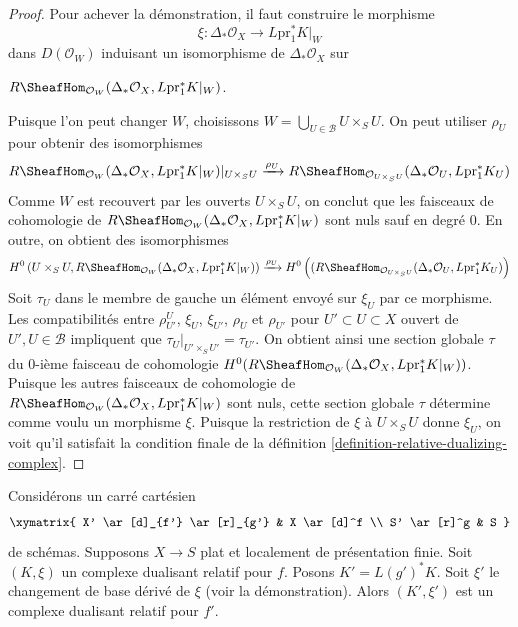 \begin{proof}
\medskip\noindent
Pour achever la démonstration, il faut construire le morphisme
$$
\xi : \Delta_*\mathcal{O}_X \longrightarrow L\text{pr}_1^*K|_W
$$
dans $D(\mathcal{O}_W)$ induisant un isomorphisme de $\Delta_*\mathcal{O}_X$ sur
\par\noindent\hfil
$R\SheafHom_{\mathcal{O}_W}(\Delta_*\mathcal{O}_X, L\text{pr}_1^*K|_W)$.
\hfil\par\noindent
Puisque l'on peut changer $W$, choisissons $W = \bigcup_{U \in \mathcal{B}} U \times_S U$. On peut utiliser $\rho_U$ pour obtenir des isomorphismes
$$
R\SheafHom_{\mathcal{O}_W}(
\Delta_*\mathcal{O}_X, L\text{pr}_1^*K|_W)|_{U \times_S U}
\xrightarrow{\rho_U}
R\SheafHom_{\mathcal{O}_{U \times_S U}}(
\Delta_*\mathcal{O}_U, L\text{pr}_1^*K_U)
$$
Comme $W$ est recouvert par les ouverts $U \times_S U$, on conclut que les faisceaux de cohomologie de
$R\SheafHom_{\mathcal{O}_W}(\Delta_*\mathcal{O}_X, L\text{pr}_1^*K|_W)$
sont nuls sauf en degré $0$. En outre, on obtient des isomorphismes
\begingroup\small
$$
H^0\left(U \times_S U, R\SheafHom_{\mathcal{O}_W}(\Delta_*\mathcal{O}_X,
L\text{pr}_1^*K|_W)\right)
\xrightarrow{\rho_U}
H^0\left((R\SheafHom_{\mathcal{O}_{U \times_S U}}(
\Delta_*\mathcal{O}_U, L\text{pr}_1^*K_U)\right)
$$
\endgroup
Soit $\tau_U$ dans le membre de gauche un élément envoyé sur $\xi_U$ par ce morphisme. Les compatibilités entre $\rho^U_{U'}$, $\xi_U$, $\xi_{U'}$, $\rho_U$ et $\rho_{U'}$ pour $U' \subset U \subset X$ ouvert de $U', U \in \mathcal{B}$ impliquent que $\tau_U|_{U' \times_S U'} = \tau_{U'}$. On obtient ainsi une section globale $\tau$ du $0$-ième faisceau de cohomologie $H^0(R\SheafHom_{\mathcal{O}_W}(\Delta_*\mathcal{O}_X, L\text{pr}_1^*K|_W))$. Puisque les autres faisceaux de cohomologie de
$R\SheafHom_{\mathcal{O}_W}(\Delta_*\mathcal{O}_X, L\text{pr}_1^*K|_W)$
sont nuls, cette section globale $\tau$ détermine comme voulu un morphisme $\xi$. Puisque la restriction de $\xi$ à $U \times_S U$ donne $\xi_U$, on voit qu'il satisfait la condition finale de la définition \ref{definition-relative-dualizing-complex}.
\end{proof}

\begin{lemma}
\label{lemma-base-change-relative-dualizing}
Considérons un carré cartésien
$$
\xymatrix{
X' \ar[d]_{f'} \ar[r]_{g'} & X \ar[d]^f \\
S' \ar[r]^g & S
}
$$
de schémas. Supposons $X \to S$ plat et localement de présentation finie. Soit $(K, \xi)$ un complexe dualisant relatif pour $f$. Posons $K' = L(g')^*K$. Soit $\xi'$ le changement de base dérivé de $\xi$ (voir la démonstration). Alors $(K', \xi')$ est un complexe dualisant relatif pour $f'$.
\end{lemma}

